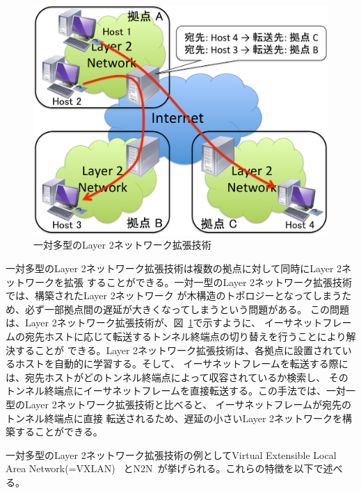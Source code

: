 \begin{figure}
	\begin{center}
		\includegraphics[scale=0.50]{./img/1tomulti}
		\caption{一対多型のLayer 2ネットワーク拡張技術}
		\label{img:1tomulti}
	\end{center}
\end{figure}

一対多型のLayer 2ネットワーク拡張技術は複数の拠点に対して同時にLayer 2ネットワークを拡張
することができる。一対一型のLayer 2ネットワーク拡張技術では、構築されたLayer 2ネットワーク
が木構造のトポロジーとなってしまうため、必ず一部拠点間の遅延が大きくなってしまうという問題がある。
この問題は、Layer 2ネットワーク拡張技術が、図~\ref{img:1tomulti}で示すように、
イーサネットフレームの宛先ホストに応じて転送するトンネル終端点の切り替えを行うことにより解決することが
できる。Layer 2ネットワーク拡張技術は、各拠点に設置されているホストを自動的に学習する。そして、
イーサネットフレームを転送する際には、宛先ホストがどのトンネル終端点によって収容されているか検索し、
そのトンネル終端点にイーサネットフレームを直接転送する。この手法では、一対一型のLayer 2ネットワーク拡張技術と比べると、
イーサネットフレームが宛先のトンネル終端点に直接
転送されるため、遅延の小さいLayer 2ネットワークを構築することができる。

一対多型のLayer 2ネットワーク拡張技術の例としてVirtual Extensible Local Area Network(=VXLAN)~\cite{id:vxlan}
とN2N~\cite{n2n}が挙げられる。これらの特徴を以下で述べる。

